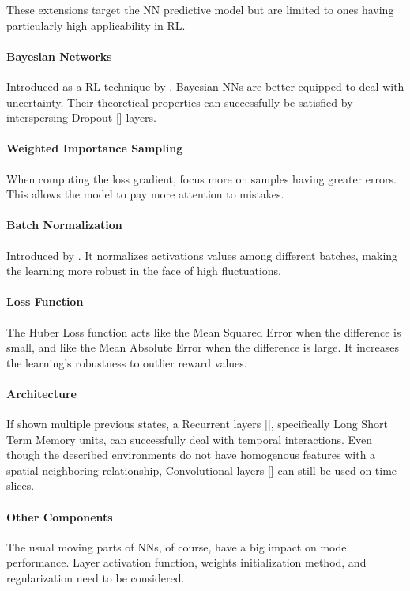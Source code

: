 \documentclass{article}
\begin{document}
These extensions target the NN predictive model but are limited to ones having particularly high applicability in RL.

\paragraph{Bayesian Networks} Introduced as a RL technique by \cite{bnn}. Bayesian NNs are better equipped to deal with uncertainty. Their theoretical properties can successfully be satisfied by interspersing Dropout [\cite{dropout}] layers.

\paragraph{Weighted Importance Sampling} When computing the loss gradient, focus more on samples having greater errors. This allows the model to pay more attention to mistakes.

\paragraph{Batch Normalization} Introduced by \cite{bn}. It normalizes activations values among different batches, making the learning more robust in the face of high fluctuations.

\paragraph{Loss Function} The Huber Loss function acts like the Mean Squared Error when the difference is small, and like the Mean Absolute Error when the difference is large. It increases the learning's robustness to outlier reward values.

\paragraph{Architecture} If shown multiple previous states, a Recurrent layers [\cite{dl-book}], specifically Long Short Term Memory units, can successfully deal with temporal interactions. Even though the described environments do not have homogenous features with a spatial neighboring relationship, Convolutional layers [\cite{dl-book}] can still be used on time slices.

\paragraph{Other Components} The usual moving parts of NNs, of course, have a big impact on model performance. Layer activation function, weights initialization method, and regularization need to be considered.
\end{document}
